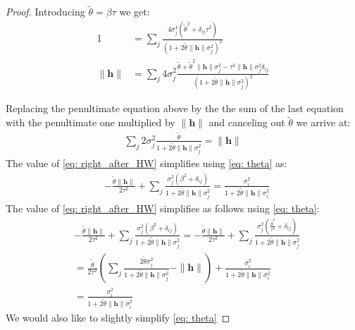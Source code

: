 \documentclass[10pt,a4paper]{amsart}
\begin{document}
\begin{proof}
Introducing $\tilde{\theta}= \beta\tau$ we get:
\begin{align*}
1 &=  \sum_j \frac{4\sigma_j^4(\tilde{\theta}^2 + \delta_{ij}\tau^2)}{(1 + 2\tilde{\theta}\|\mathbf{h}\|\sigma_j^2)^2} \\
\|\mathbf{h}\| &= \sum_j 4 \sigma_j^2 \frac{\tilde{\theta} + \tilde{\theta}^2\|\mathbf{h}\|\sigma_j^2 - \tau^2 \|\mathbf{h}\|\sigma_j^2 \delta_{ij}}{(1 + 2\tilde{\theta}\|\mathbf{h}\|\sigma_j^2)^2} \nonumber
\end{align*}

Replacing the penultimate equation above by the the sum of the last equation with the penultimate one multiplied by $\|\mathbf{h}\|$ and canceling out $\tilde{\theta}$ we arrive at:
\begin{align}\label{eq: theta}
\sum_j 2 \sigma_j^2 \frac{\tilde{\theta}}{1 + 2\tilde{\theta}\|\mathbf{h}\|\sigma_j^2} = \|\mathbf{h}\| 
\end{align}
The value of \eqref{eq: right_after_HW} simplifies using \eqref{eq: theta} as:
\begin{align*}
&- \frac{\tilde{\theta}\|\mathbf{h}\|}{2\tau^2} +  \sum_j \frac{\sigma_j^2(\beta^2 + \delta_{ij})}{1 + 2\tilde{\theta}\|\mathbf{h}\|\sigma_j^2} = \frac{\sigma_i^2}{1 + 2\tilde{\theta}\|\mathbf{h}\|\sigma_i^2}
\end{align*}
The value of \eqref{eq: right_after_HW} simplifies as follows using \eqref{eq: theta}:
\begin{align*}
&- \frac{\tilde{\theta}\|\mathbf{h}\|}{2\tau^2} +  \sum_j \frac{\sigma_j^2(\beta^2 + \delta_{ij})}{1 + 2\tilde{\theta}\|\mathbf{h}\|\sigma_j^2} = - \frac{\tilde{\theta}\|\mathbf{h}\|}{2\tau^2} +  \sum_j \frac{\sigma_j^2(\frac{\tilde{\theta}^2}{\tau^2} + \delta_{ij})}{1 + 2\tilde{\theta}\|\mathbf{h}\|\sigma_j^2 } \\
&=   \frac{\tilde{\theta}}{2\tau^2} \left( \sum_j \frac{2\tilde{\theta} \sigma_j^2}{1 + 2\tilde{\theta}\|\mathbf{h}\|\sigma_j^2 } -\|\mathbf{h}\| \right) +   \frac{\sigma_i^2}{1 + 2\tilde{\theta}\|\mathbf{h}\|\sigma_i^2}\\ & = \frac{\sigma_i^2}{1 + 2\tilde{\theta}\|\mathbf{h}\|\sigma_i^2}
\end{align*}
We would also like to slightly simplify \eqref{eq: theta}

\end{proof}
\end{document}
